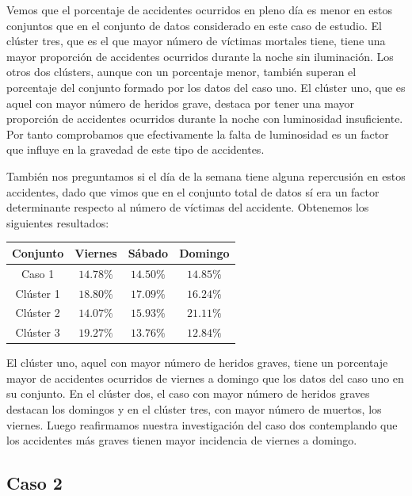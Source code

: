\documentclass[a4]{article}
\begin{document}
Vemos que el porcentaje de accidentes ocurridos en pleno día es menor en estos conjuntos que en el conjunto de datos considerado en este caso de estudio. El clúster tres, que es el que mayor número de víctimas mortales tiene, tiene una mayor proporción de accidentes ocurridos durante la noche sin iluminación. Los otros dos clústers, aunque con un porcentaje menor, también superan el porcentaje del conjunto formado por los datos del caso uno. El clúster uno, que es aquel con mayor número de heridos grave, destaca por tener una mayor proporción de accidentes ocurridos durante la noche con luminosidad insuficiente. Por tanto comprobamos que efectivamente la falta de luminosidad es un factor que influye en la gravedad de este tipo de accidentes.

También nos preguntamos si el día de la semana tiene alguna repercusión en estos accidentes, dado que vimos que en el conjunto total de datos sí era un factor determinante respecto al número de víctimas del accidente. Obtenemos los siguientes resultados:

\begin{center}
\begin{tabular}{|c|c|c|c|}
\hline
  \multicolumn{1}{|c|}{\textbf{Conjunto}} & \textbf{Viernes} & \textbf{Sábado} &  \textbf{Domingo}\\ \hline
  Caso 1    & $14.78\%$ & $14.50\%$ & $14.85\%$ \\ \hline
  Clúster 1 & $18.80\%$ & $17.09\%$ & $16.24\%$ \\ \hline
  Clúster 2 & $14.07\%$ & $15.93\%$ & $21.11\%$ \\ \hline
  Clúster 3 & $19.27\%$ & $13.76\%$ & $12.84\%$ \\ \hline
\end{tabular}
\end{center}

El clúster uno, aquel con mayor número de heridos graves, tiene un porcentaje mayor de accidentes ocurridos de viernes a domingo que los datos del caso uno en su conjunto. En el clúster dos, el caso con mayor número de heridos graves destacan los domingos y en el clúster tres, con mayor número de muertos, los viernes. Luego reafirmamos nuestra investigación del caso dos contemplando que los accidentes más graves tienen mayor incidencia de viernes a domingo.

\subsection{Caso 2}
\end{document}
